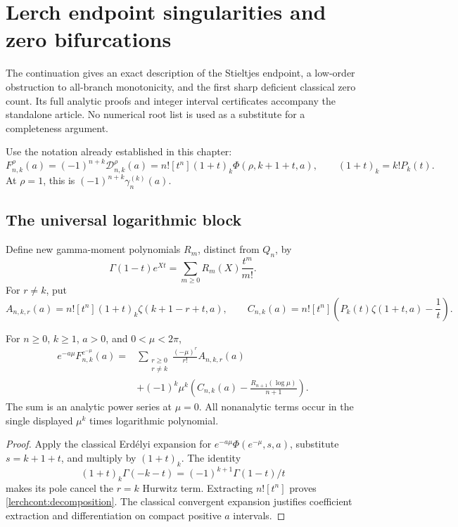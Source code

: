 \section{Lerch endpoint singularities and zero bifurcations}
\label{lerchcont:section}
The continuation \cite{lerchcont2026} gives an exact description of the
Stieltjes endpoint, a low-order obstruction to all-branch monotonicity, and
the first sharp deficient classical zero count. Its full analytic proofs and
integer interval certificates accompany the standalone article. No numerical
root list is used as a substitute for a completeness argument.

Use the notation already established in this chapter:
\[
 F_{n,k}^{\rho}(a)=(-1)^{n+k}\mathcal D_{n,k}^{\rho}(a)
 =n![t^n](1+t)_k\Phi(\rho,k+1+t,a),\qquad (1+t)_k=k!P_k(t).
\]
At $\rho=1$, this is $(-1)^{n+k}\gamma_n^{(k)}(a)$.

\subsection{The universal logarithmic block}
Define new gamma-moment polynomials $R_m$, distinct from $Q_n$, by
\[
 \Gamma(1-t)e^{Xt}=\sum_{m\ge0}R_m(X)\frac{t^m}{m!}.
\]
For $r\ne k$, put
\[
 A_{n,k,r}(a)=n![t^n](1+t)_k\zeta(k+1-r+t,a),\qquad
 C_{n,k}(a)=n![t^n]\left(P_k(t)\zeta(1+t,a)-\frac1t\right).
\]
\begin{theorem}\label{lerchcont:endpoint}
For $n\ge0$, $k\ge1$, $a>0$, and $0<\mu<2\pi$,
\begin{equation}\label{lerchcont:decomposition}
\begin{aligned}
 e^{-a\mu}F_{n,k}^{e^{-\mu}}(a)
 ={}&\sum_{\substack{r\ge0\\r\ne k}}\frac{(-\mu)^r}{r!}A_{n,k,r}(a)\\
 &+(-1)^k\mu^k\left(C_{n,k}(a)
                 -\frac{R_{n+1}(\log\mu)}{n+1}\right).
\end{aligned}
\end{equation}
The sum is an analytic power series at $\mu=0$. All nonanalytic terms occur
in the single displayed $\mu^k$ times logarithmic polynomial.
\end{theorem}
\begin{proof}
Apply the classical Erd\'elyi expansion for
$e^{-a\mu}\Phi(e^{-\mu},s,a)$, substitute $s=k+1+t$, and multiply by
$(1+t)_k$. The identity
\[
 (1+t)_k\Gamma(-k-t)=(-1)^{k+1}\Gamma(1-t)/t
\]
makes its pole cancel the $r=k$ Hurwitz term. Extracting $n![t^n]$ proves
\eqref{lerchcont:decomposition}. The classical convergent expansion justifies
coefficient extraction and differentiation on compact positive $a$ intervals.
\end{proof}

